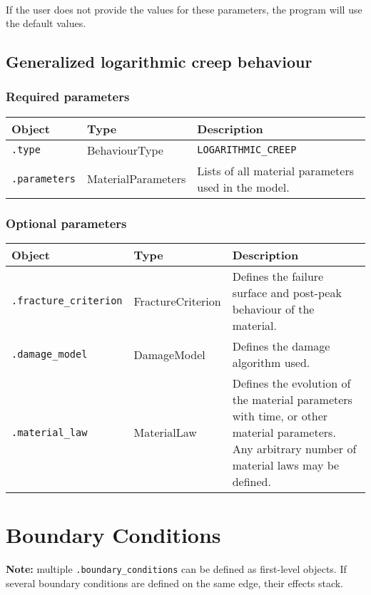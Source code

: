 \documentclass[10pt]{article}
\begin{document}
\paragraph{} If the user does not provide the values for these parameters, the program will use the default values.

\subsection{Generalized logarithmic creep behaviour}

\subsubsection*{Required parameters}

\begin{tabularx}{\textwidth}{llX}
\hline 
Object & Type & Description \\ 
\hline 
\verb+.type+ & BehaviourType & \verb+LOGARITHMIC_CREEP+ \\ 
\verb+.parameters+ & MaterialParameters & Lists of all material parameters used in the model.\\
\hline 
\end{tabularx}

\subsubsection*{Optional parameters}

\begin{tabularx}{\textwidth}{llX}
\hline 
Object & Type & Description \\ 
\hline 
\verb+.fracture_criterion+ & FractureCriterion & Defines the failure surface and post-peak behaviour of the material.\\
\verb+.damage_model+ & DamageModel & Defines the damage algorithm used.\\
\verb+.material_law+ & MaterialLaw & Defines the evolution of the material parameters with time, or other material parameters. Any arbitrary number of material laws may be defined. \\ 
\hline 
\end{tabularx}

\section{Boundary Conditions}

\textbf{Note:} multiple \verb+.boundary_conditions+ can be defined as first-level objects. If several boundary conditions are defined on the same edge, their effects stack.
\end{document}
